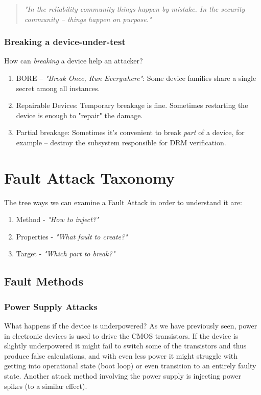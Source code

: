 \begin{quote}
	\textit{"In the reliability community things happen by mistake. In the security community -- things happen on purpose."}
\end{quote}

\subsubsection*{Breaking a device-under-test}
How can \emph{breaking} a device help an attacker?

\begin{enumerate}
	\item BORE -- \textit{"Break Once, Run Everywhere"}: Some device families share a single secret among all instances.
	\item Repairable Devices: Temporary breakage is fine. Sometimes restarting the device is enough to "repair" the damage.
	\item Partial breakage: Sometimes it's convenient to break \emph{part} of a device, for example -- destroy the subsystem responsible for DRM verification.
\end{enumerate}

\section{Fault Attack Taxonomy}
The tree ways we can examine a Fault Attack in order to understand it are:
\begin{enumerate}
	\item Method - \emph{"How to inject?"}
	\item Properties - \emph{"What fault to create?"}
	\item Target - \emph{"Which part to break?"}
\end{enumerate}

\subsection{Fault Methods}

\subsubsection{Power Supply Attacks}
What happens if the device is underpowered?
As we have previously seen, power in electronic devices is used to drive the CMOS transistors. If the device is slightly underpowered it might fail to switch some of the transistors and thus produce false calculations, and with even less power it might  struggle with getting into operational state (boot loop) or even transition to an entirely faulty state.
Another attack method involving the power supply is injecting power spikes (to a similar effect).

